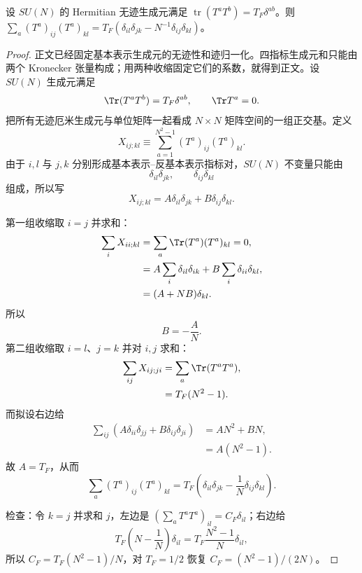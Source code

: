 \begin{lemma}[基本表示的完整性恒等式]
设 $SU(N)$ 的 Hermitian 无迹生成元满足 $\operatorname{tr}(T^aT^b)=T_F\delta^{ab}$。则 $\sum_a(T^a)_{ij}(T^a)_{kl}=T_F(\delta_{il}\delta_{jk}-N^{-1}\delta_{ij}\delta_{kl})$。
\end{lemma}
\begin{proof}
正文已经固定基本表示生成元的无迹性和迹归一化。四指标生成元和只能由两个 Kronecker 张量构成；用两种收缩固定它们的系数，就得到正文。设 $SU(N)$ 生成元满足
\begin{equation*}
 \Tr(T^aT^b)=T_F\delta^{ab},
 \qquad \Tr T^a=0.
\end{equation*}
把所有无迹厄米生成元与单位矩阵一起看成 $N\times N$ 矩阵空间的一组正交基。定义
\begin{equation*}
 X_{ij;kl}\equiv\sum_{a=1}^{N^2-1}(T^a)_{ij}(T^a)_{kl}.
\end{equation*}
由于 $i,l$ 与 $j,k$ 分别形成基本表示--反基本表示指标对，$SU(N)$ 不变量只能由
\begin{equation*}
 \delta_{il}\delta_{jk},
 \qquad
 \delta_{ij}\delta_{kl}
\end{equation*}
组成，所以写
\begin{equation*}
 X_{ij;kl}=A\delta_{il}\delta_{jk}+B\delta_{ij}\delta_{kl}.
\end{equation*}

第一组收缩取 $i=j$ 并求和：
\begin{align*}
 \sum_iX_{ii;kl}
 &=\sum_a\Tr(T^a)(T^a)_{kl}=0,\\
 &=A\sum_i\delta_{il}\delta_{ik}
 +B\sum_i\delta_{ii}\delta_{kl},\\
 &=(A+NB)\delta_{kl}.
\end{align*}
所以
\begin{equation*}
 B=-\frac AN.
\end{equation*}
第二组收缩取 $i=l$、$j=k$ 并对 $i,j$ 求和：
\begin{align*}
 \sum_{ij}X_{ij;ji}
 &=\sum_a\Tr(T^aT^a),\\
 &=T_F(N^2-1).
\end{align*}
而拟设右边给
\begin{align*}
 \sum_{ij}
 \left(A\delta_{ii}\delta_{jj}+B\delta_{ij}\delta_{ji}\right)
 &=AN^2+BN,\\
 &=A(N^2-1).
\end{align*}
故 $A=T_F$，从而
\begin{equation*}
 {
 \sum_a(T^a)_{ij}(T^a)_{kl}
 =T_F\left(
 \delta_{il}\delta_{jk}
 -\frac1N\delta_{ij}\delta_{kl}
 \right).}
\end{equation*}

检查：令 $k=j$ 并求和 $j$，左边是 $(\sum_aT^aT^a)_{il}=C_F\delta_{il}$；右边给
\begin{equation*}
 T_F\left(N-\frac1N\right)\delta_{il}
 =T_F\frac{N^2-1}{N}\delta_{il},
\end{equation*}
所以 $C_F=T_F(N^2-1)/N$，对 $T_F=1/2$ 恢复 $C_F=(N^2-1)/(2N)$。
\end{proof}

